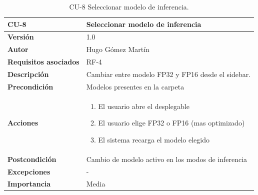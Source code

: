 \begin{table}[p]
	\centering
	\begin{tabularx}{\linewidth}{ p{} p{} }
		\toprule
		\textbf{CU-8}    & \textbf{Seleccionar modelo de inferencia}\\
		\toprule
		\textbf{Versión}              & 1.0    \\
		\textbf{Autor}                & Hugo Gómez Martín \\
		\textbf{Requisitos asociados} & RF-4 \\
		\textbf{Descripción}          & Cambiar entre modelo FP32 y FP16 desde el sidebar. \\
		\textbf{Precondición}         & Modelos presentes en la carpeta\\
		\textbf{Acciones}             &
		\begin{enumerate}
			\def\labelenumi{\arabic{enumi}.}
			\tightlist
			\item El usuario abre el desplegable 
                \item El usuario elige FP32 o FP16 (mas optimizado)
			\item El sistema recarga el modelo elegido
		\end{enumerate}\\
		\textbf{Postcondición}        & Cambio de modelo activo en los modos de inferencia \\
		\textbf{Excepciones}          & - \\
		\textbf{Importancia}          & Media \\
		\bottomrule
	\end{tabularx}
	\caption{CU-8 Seleccionar modelo de inferencia.}
\end{table}

